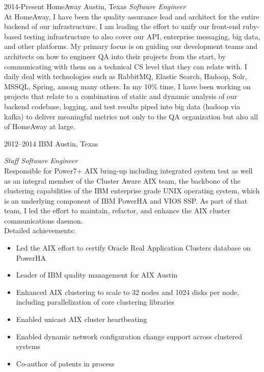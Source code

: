 \documentclass['print']{friggeri-cv} %
\begin{document}
\begin{entrylist}
\entry
{2014-Present}
{HomeAway}
{Austin, Texas}
{\emph{Software Engineer} \\
At HomeAway, I have been the quality assurance lead and architect for the entire backend of our infrastructure. I am leading the effort to unify our front-end ruby-based testing infrastructure to also cover our API, enterprise messaging, big data, and other platforms.
\newline
\newline
My primary focus is on guiding our development teams and architects on how to engineer QA into their projects from the start, by communicating with them on a technical CS level that they can relate with. I daily deal with technologies such as RabbitMQ, Elastic Search, Hadoop, Solr, MSSQL, Spring, among many others.
\newline
\newline
In my 10\% time, I have been working on projects that relate to a combination of static and dynamic analysis of our backend codebase, logging, and test results piped into big data (hadoop via kafka) to deliver meaningful metrics not only to the QA organization but also all of HomeAway at large. }
\end{entrylist}
\begin{entrylist}
\entry
{2012--2014}
{IBM}
{Austin, Texas}
{\emph{Staff Software Engineer} \\
Responsible for Power7+ AIX bring-up including integrated system test as well as an integral member of the
Cluster Aware AIX team, the backbone of the clustering capabilities of the IBM enterprise grade UNIX operating system,
which is an underlying component of IBM PowerHA and VIOS SSP. As part of that team, I led the effort to maintain, refactor,
and enhance the AIX cluster communications daemon. \\
Detailed achievements:
\begin{itemize}
\item Led the AIX effort to certify Oracle Real Application Clusters database on PowerHA
\item Leader of IBM quality management for AIX Austin
\item Enhanced AIX clustering to scale to 32 nodes and 1024 disks per node, including parallelization of core clustering libraries
\item Enabled unicast AIX cluster heartbeating
\item Enabled dynamic network configuration change support across clustered systems
\item Co-author of patents in process
\end{itemize}}
\end{entrylist}
\end{document}
